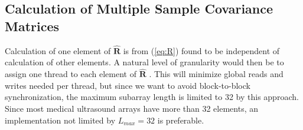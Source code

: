\documentclass[journal]{IEEEtran}
\newcommand{\mat}[1]{\mathbf{#1}}
\newcommand{\R}{$\mat{\hat{R}}$ }
\begin{document}


\subsection{Calculation of Multiple Sample Covariance Matrices}\label{sec:calcR}


Calculation of one element of \R is from (\ref{eq:R}) found to be independent of calculation of other elements. A natural level of granularity would then be to assign one thread to each element of $\mat{\hat{R}}$ \cite{Chen2011}. This will minimize global reads and writes needed per thread, but since we want to avoid block-to-block synchronization, the maximum subarray length is limited to 32 by this approach. Since most medical ultrasound arrays have more than 32 elements, an implementation not limited by $L_{max}=32$ is preferable.
\end{document}
